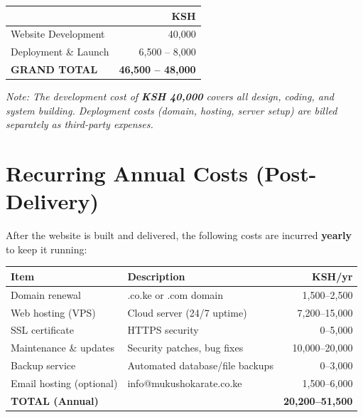 \documentclass[12pt,a4paper]{article}
\begin{document}
\begin{center}
\begin{tabular}{lr}
    \toprule
    & \textbf{KSH} \\
    \midrule
    Website Development & 40,000 \\
    Deployment \& Launch & 6,500 -- 8,000 \\
    \midrule
    \textbf{GRAND TOTAL} & \textbf{46,500 -- 48,000} \\
    \bottomrule
\end{tabular}
\end{center}

\begin{small}
\textit{Note: The development cost of \textbf{KSH 40,000} covers all design, coding, and system building. Deployment costs (domain, hosting, server setup) are billed separately as third-party expenses.}
\end{small}

\section{Recurring Annual Costs (Post-Delivery)}

After the website is built and delivered, the following costs are incurred \textbf{yearly} to keep it running:

\begin{longtable}{p{4cm}p{5cm}r}
    \toprule
    \textbf{Item} & \textbf{Description} & \textbf{KSH/yr} \\
    \midrule
    \endfirsthead
    Domain renewal & .co.ke or .com domain & 1,500--2,500 \\
    Web hosting (VPS) & Cloud server (24/7 uptime) & 7,200--15,000 \\
    SSL certificate & HTTPS security & 0--5,000 \\
    Maintenance \& updates & Security patches, bug fixes & 10,000--20,000 \\
    Backup service & Automated database/file backups & 0--3,000 \\
    Email hosting (optional) & info@mukushokarate.co.ke & 1,500--6,000 \\
    \midrule
    \textbf{TOTAL (Annual)} & & \textbf{20,200--51,500} \\
    \bottomrule
\end{longtable}
\end{document}
